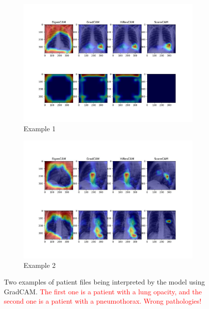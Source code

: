 \documentclass[11pt]{article}
\newcommand\myworries[1]{\textcolor{red}{#1}}
\begin{document}
        \begin{figure}[H]
                 \centering
                 \begin{subfigure}[b]{0.45\textwidth}
                     \centering
                     \includegraphics[width=\textwidth]{CheXpert2/inference/heatmaps_3.jpg}
                     \caption{Example 1}
                     \vspace{4ex}
                     \label{fig:gradcam3}
                 \end{subfigure}
                 \hfill
                 \begin{subfigure}[b]{0.45\textwidth}
                     \centering
                     \includegraphics[width=\textwidth]{CheXpert2/inference/heatmaps_6.jpg}
                     \caption{Example 2}
                     \vspace{4ex}
                     \label{fig:gradcam4}
                 \end{subfigure}
                 \label{fig:gradcam_example_chexpert}
                 \caption{Two examples of patient files being interpreted by the model using GradCAM. \myworries{The first one is a patient with a lung opacity, and the second one is a patient with a pneumothorax. Wrong pathologies!}}

            \end{figure}
\end{document}

